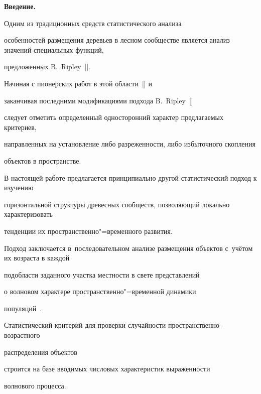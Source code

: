 \maketitle



\textbf{Введение.}

Одним из традиционных средств статистического анализа 

особенностей размещения деревьев в лесном сообществе является анализ значений специальных функций,

предложенных B.~Ripley~[]. 



Начиная с пионерских работ в этой области~[] и 

заканчивая последними модификациями подхода B.~Ripley~[] 

следует отметить определенный односторонний характер предлагаемых критериев, 

направленных  на установление либо  разреженности, либо избыточного скопления 

объектов в пространстве.

 

В настоящей работе предлагается принципиально другой статистический подход к изучению 

горизонтальной структуры древесных сообществ, позволяющий  локально характеризовать 

тенденции их пространственно"=временного развития. 

Подход заключается в~последовательном анализе размещения объектов с~учётом их возраста в каждой 

подобласти заданного участка местности в свете представлений

о волновом характере пространственно"=временной динамики 

популяций~\cite{kislovbr:bib:kolmogorov}. 

Статистический критерий для проверки случайности пространственно-возрастного 

распределения объектов

строится на базе  вводимых числовых характеристик выраженности 

волнового процесса.



\smallskip



